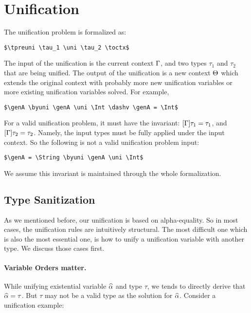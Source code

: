 \section{Unification}
\label{sec:unification}

The unification problem is formalized as:

\begin{lstlisting}
$\tpreuni \tau_1 \uni \tau_2 \toctx$
\end{lstlisting}

The input of the unification is the current context $\Gamma$, and two types
$\tau_1$ and $\tau_2$ that are being unified. The output of the unification
is a new context $\Theta$ which extends the original context with probably more
new unification variables or more existing
unification variables solved. For example,

\begin{lstlisting}
$\genA \byuni \genA \uni \Int \dashv \genA = \Int$
\end{lstlisting}

For a valid unification problem, it must have the invariant: $[\Gamma] \tau_1 =
\tau_1$, and $[\Gamma] \tau_2 = \tau_2$. Namely, the input types must be
fully applied under the input context. So the following is not a valid
unification problem input:

\begin{lstlisting}
$\genA = \String \byuni \genA \uni \Int$
\end{lstlisting}

We assume this invariant is maintained through the whole
formalization.

\subsection{Type Sanitization}

As we mentioned before, our unification is based on alpha-equality. So in most
cases, the unification rules are intuitively structural. The most difficult
one which is also the most essential one, is how to unify a unification variable
with another type. We discuss those cases first.

\paragraph{Variable Orders matter.}

While unifying existential variable $\widehat{\alpha}$ and type $\tau$, we tends to
directly derive that $\widehat{\alpha} = \tau$. But $\tau$ may not be a valid type as the
solution for $\widehat{\alpha}$.
Consider a unification example:

